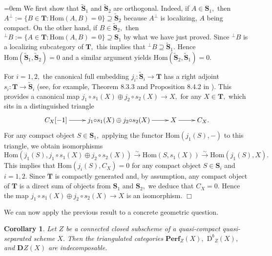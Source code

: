 \documentclass[a4paper,11pt,twoside]{amsart}
\newtheorem{cor}[thm]{Corollary}
\numberwithin{equation}{section}
\theoremstyle{definition}
\renewenvironment{proof}{\par\vspace{-5pt}\par\noindent\begingroup\leftskip=0em\hspace{0em}{\bf Proof.}}{\endgroup\hfill$\Box$}
\begin{document}
\begin{proof}
We first show that $\tilde{{{\mathbf{{S}}}}}_1$ and $\tilde{{{\mathbf{{S}}}}}_2$ are
orthogonal. Indeed, if $A\in{{\mathbf{{S}}}}_1,$ then
${{A}^{\perp}}:=\{B\in{{\mathbf{{T}}}}:{\mathrm{Hom}}(A,B)=0\}\supseteq\tilde{{{\mathbf{{S}}}}}_2$
because ${{A}^{\perp}}$ is localizing, $A$ being compact. On the other
hand, if $B\in\tilde{{{\mathbf{{S}}}}}_2,$ then
${{}^{\perp}{B}}:=\{A\in{{\mathbf{{T}}}}:{\mathrm{Hom}}(A,B)=0\}\supseteq{{\mathbf{{S}}}}_1$ by what we
have just proved. Since ${{}^{\perp}{B}}$ is a localizing subcategory of
${{\mathbf{{T}}}},$ this implies that
${{}^{\perp}{B}}\supseteq\tilde{{{\mathbf{{S}}}}}_1.$ Hence
${\mathrm{Hom}}(\tilde{{{\mathbf{{S}}}}}_1,\tilde{{{\mathbf{{S}}}}}_2)=0$ and a similar argument
yields ${\mathrm{Hom}}(\tilde{{{\mathbf{{S}}}}}_2,\tilde{{{\mathbf{{S}}}}}_1)=0.$

For $i=1,2,$ the canonical full embedding
$j_i\colon\tilde{{{\mathbf{{S}}}}}_i\to{{\mathbf{{T}}}}$ has a right adjoint
$s_i\colon{{\mathbf{{T}}}}\to\tilde{{{\mathbf{{S}}}}}_i$ (see, for example, Theorem 8.3.3 and Proposition 8.4.2 in \cite{N2}). This provides a canonical map
$j_1{\circ} s_1(X)\oplus j_2{\circ} s_2(X)\to X,$ for any $X\in{{\mathbf{{T}}}},$ which sits
in a distinguished triangle
\[
\xymatrix{{{C_X}[-1]} \ar[r] & j_1{\circ} s_1(X)\oplus j_2{\circ} s_2(X) \ar[r] & X \ar[r] &
C_X.}
\]
For any compact object $S\in{{\mathbf{{S}}}}_1,$ applying the functor
${\mathrm{Hom}}(j_1(S),{-})$ to this triangle, we obtain isomorphisms
\[
{\mathrm{Hom}}(j_1(S),j_1{\circ} s_1(X)\oplus j_2{\circ} s_2(X)){{\xrightarrow{{\sim}}}}{\mathrm{Hom}}(S,s_1(X)){{\xrightarrow{{\sim}}}}{\mathrm{Hom}}(j_1(S), X).
\]
This implies that ${\mathrm{Hom}}(j_i(S),C_X)=0$ for any compact object
$S\in{{\mathbf{{S}}}}_i$ and $i=1,2.$  Since ${{\mathbf{{T}}}}$ is compactly generated
and, by assumption, any compact object of ${{\mathbf{{T}}}}$ is a direct sum of
objects from ${{\mathbf{{S}}}}_1$ and ${{\mathbf{{S}}}}_2,$ we deduce that $C_X=0.$
Hence the map $j_1{\circ} s_1(X)\oplus j_2{\circ} s_2(X)\to X$ is an isomorphism.
\end{proof}

We can now apply the previous result to a concrete geometric question.

\begin{cor}\label{cor:orth}
Let $Z$ be a connected closed subscheme of a quasi-compact quasi-separated scheme $X.$ Then the triangulated categories ${{{\mathbf{{Perf}}}}}_Z(X),$ ${\mathrm{D}^b}_Z(X),$ and ${\mathbf{D}^{}}Z(X)$ are indecomposable.
\end{cor}
\end{document}
